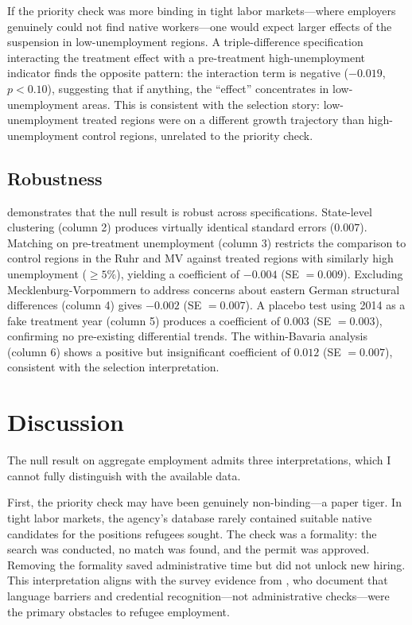 \documentclass[12pt]{article}
\begin{document}
If the priority check was more binding in tight labor markets---where employers genuinely could not find native workers---one would expect larger effects of the suspension in low-unemployment regions. A triple-difference specification interacting the treatment effect with a pre-treatment high-unemployment indicator finds the opposite pattern: the interaction term is negative ($-0.019$, $p < 0.10$), suggesting that if anything, the ``effect'' concentrates in low-unemployment areas. This is consistent with the selection story: low-unemployment treated regions were on a different growth trajectory than high-unemployment control regions, unrelated to the priority check.

\subsection{Robustness}

 demonstrates that the null result is robust across specifications. State-level clustering (column 2) produces virtually identical standard errors ($0.007$). Matching on pre-treatment unemployment (column 3) restricts the comparison to control regions in the Ruhr and MV against treated regions with similarly high unemployment ($\geq 5\%$), yielding a coefficient of $-0.004$ (SE $= 0.009$). Excluding Mecklenburg-Vorpommern to address concerns about eastern German structural differences (column 4) gives $-0.002$ (SE $= 0.007$). A placebo test using 2014 as a fake treatment year (column 5) produces a coefficient of $0.003$ (SE $= 0.003$), confirming no pre-existing differential trends. The within-Bavaria analysis (column 6) shows a positive but insignificant coefficient of $0.012$ (SE $= 0.007$), consistent with the selection interpretation.




\section{Discussion}

The null result on aggregate employment admits three interpretations, which I cannot fully distinguish with the available data.

First, the priority check may have been genuinely non-binding---a paper tiger. In tight labor markets, the agency's database rarely contained suitable native candidates for the positions refugees sought. The check was a formality: the search was conducted, no match was found, and the permit was approved. Removing the formality saved administrative time but did not unlock new hiring. This interpretation aligns with the survey evidence from \citet{bruecker2016}, who document that language barriers and credential recognition---not administrative checks---were the primary obstacles to refugee employment.
\end{document}
